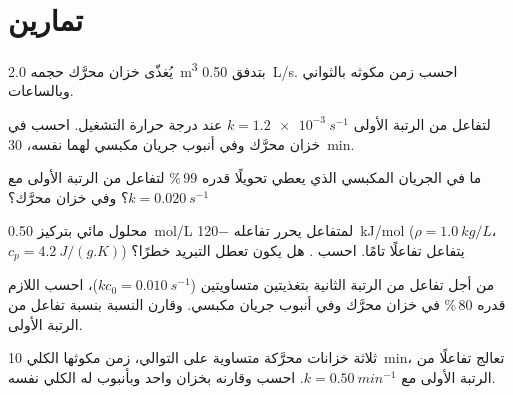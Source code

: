 \section{تمارين}

\begin{exercise}[$\star$]\label{exo:b2:continuous-reactors:1}
يُغذّى خزان محرَّك حجمه \qty{2.0}{m^3} بتدفق \qty{0.50}{L/s}. احسب زمن
مكوثه بالثواني وبالساعات.
\end{exercise}

\begin{exercise}[$\star$]\label{exo:b2:continuous-reactors:2}
لتفاعل من الرتبة الأولى $k = \qty{1.2e-3}{s^{-1}}$ عند درجة حرارة
التشغيل. احسب  في خزان محرَّك وفي أنبوب جريان مكبسي
لهما  نفسه، \qty{30}{min}.
\end{exercise}

\begin{exercise}[$\star$]\label{exo:b2:continuous-reactors:3}
ما  في الجريان المكبسي الذي يعطي تحويلًا قدره 99\,\% لتفاعل من الرتبة الأولى
مع $k = \qty{0.020}{s^{-1}}$؟ وفي خزان محرَّك؟
\end{exercise}

\begin{exercise}[$\star$]\label{exo:b2:continuous-reactors:4}
محلول مائي بتركيز \qty{0.50}{mol/L} لمتفاعل يحرر تفاعله
\qty{-120}{kJ/mol} ($\rho = \qty{1.0}{kg/L}$، $c_p =
\qty{4.2}{J/(g.K)}$) يتفاعل تفاعلًا تامًا. احسب . هل يكون تعطل التبريد خطرًا؟
\end{exercise}

\begin{exercise}[$\star\star$]\label{exo:b2:continuous-reactors:5}
من أجل تفاعل من الرتبة الثانية بتغذيتين متساويتين ($kc_0 = \qty{0.010}{s^{-1}}$)،
احسب  اللازم  قدره 80\,\% في خزان محرَّك وفي أنبوب
جريان مكبسي. وقارن النسبة بنسبة تفاعل من الرتبة الأولى.
\end{exercise}

\begin{exercise}[$\star\star$]\label{exo:b2:continuous-reactors:6}
ثلاثة خزانات محرَّكة متساوية على التوالي، زمن مكوثها الكلي \qty{10}{min}،
تعالج تفاعلًا من الرتبة الأولى مع $k = \qty{0.50}{min^{-1}}$. احسب
 وقارنه بخزان واحد وبأنبوب له  الكلي
نفسه.
\end{exercise}

